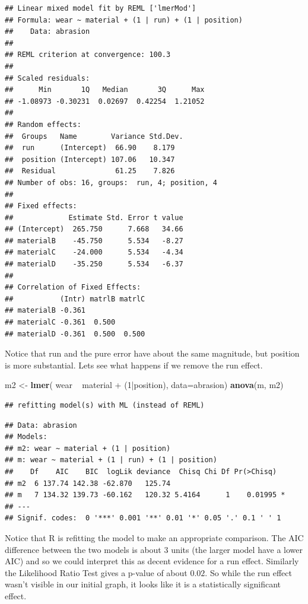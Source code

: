 \documentclass[]{book}
\newenvironment{Shaded}{\begin{snugshade}}{\end{snugshade}}
\newcommand{\KeywordTok}[1]{\textcolor[rgb]{0.13,0.29,0.53}{\textbf{{#1}}}}
\newcommand{\DataTypeTok}[1]{\textcolor[rgb]{0.13,0.29,0.53}{{#1}}}
\newcommand{\DecValTok}[1]{\textcolor[rgb]{0.00,0.00,0.81}{{#1}}}
\newcommand{\StringTok}[1]{\textcolor[rgb]{0.31,0.60,0.02}{{#1}}}
\newcommand{\NormalTok}[1]{{#1}}
\theoremstyle{definition}
\theoremstyle{definition}
\theoremstyle{remark}
\begin{document}
\begin{verbatim}
## Linear mixed model fit by REML ['lmerMod']
## Formula: wear ~ material + (1 | run) + (1 | position)
##    Data: abrasion
## 
## REML criterion at convergence: 100.3
## 
## Scaled residuals: 
##      Min       1Q   Median       3Q      Max 
## -1.08973 -0.30231  0.02697  0.42254  1.21052 
## 
## Random effects:
##  Groups   Name        Variance Std.Dev.
##  run      (Intercept)  66.90    8.179  
##  position (Intercept) 107.06   10.347  
##  Residual              61.25    7.826  
## Number of obs: 16, groups:  run, 4; position, 4
## 
## Fixed effects:
##             Estimate Std. Error t value
## (Intercept)  265.750      7.668   34.66
## materialB    -45.750      5.534   -8.27
## materialC    -24.000      5.534   -4.34
## materialD    -35.250      5.534   -6.37
## 
## Correlation of Fixed Effects:
##           (Intr) matrlB matrlC
## materialB -0.361              
## materialC -0.361  0.500       
## materialD -0.361  0.500  0.500
\end{verbatim}

Notice that run and the pure error have about the same magnitude, but
position is more substantial. Lets see what happens if we remove the run
effect.

\begin{Shaded}
\begin{Highlighting}[]
\NormalTok{m2 <-}\StringTok{ }\KeywordTok{lmer}\NormalTok{( wear ~}\StringTok{ }\NormalTok{material +}\StringTok{ }\NormalTok{(}\DecValTok{1}\NormalTok{|position), }\DataTypeTok{data=}\NormalTok{abrasion)}
\KeywordTok{anova}\NormalTok{(m, m2)}
\end{Highlighting}
\end{Shaded}

\begin{verbatim}
## refitting model(s) with ML (instead of REML)
\end{verbatim}

\begin{verbatim}
## Data: abrasion
## Models:
## m2: wear ~ material + (1 | position)
## m: wear ~ material + (1 | run) + (1 | position)
##    Df    AIC    BIC  logLik deviance  Chisq Chi Df Pr(>Chisq)  
## m2  6 137.74 142.38 -62.870   125.74                           
## m   7 134.32 139.73 -60.162   120.32 5.4164      1    0.01995 *
## ---
## Signif. codes:  0 '***' 0.001 '**' 0.01 '*' 0.05 '.' 0.1 ' ' 1
\end{verbatim}

Notice that R is refitting the model to make an appropriate comparison.
The AIC difference between the two models is about 3 units (the larger
model have a lower AIC) and so we could interpret this as decent
evidence for a run effect. Similarly the Likelihood Ratio Test gives a
p-value of about \(0.02\). So while the run effect wasn't visible in our
initial graph, it looks like it is a statistically significant effect.
\end{document}
